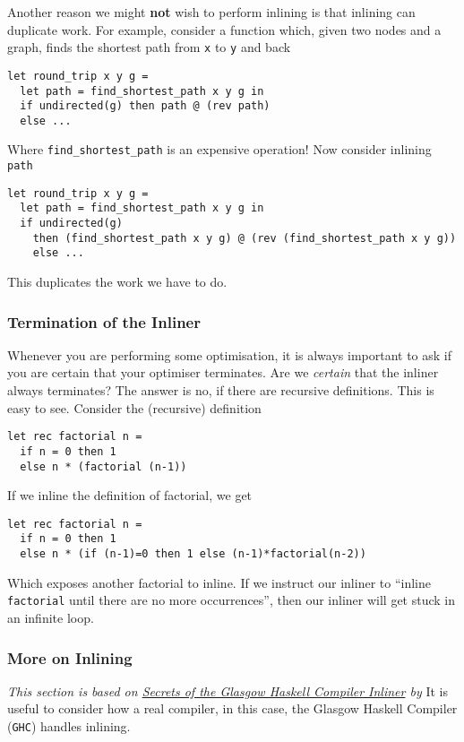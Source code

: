 Another reason we might \textbf{not} wish to perform inlining is that inlining can duplicate work. For example, consider a function which, given two nodes and a graph, finds the shortest path from \texttt{x} to \texttt{y} and back 
\begin{verbatim}
let round_trip x y g =
  let path = find_shortest_path x y g in
  if undirected(g) then path @ (rev path)
  else ...
\end{verbatim}
Where \texttt{find\_shortest\_path} is an expensive operation! Now consider inlining \texttt{path}
\begin{verbatim}
let round_trip x y g =
  let path = find_shortest_path x y g in
  if undirected(g) 
    then (find_shortest_path x y g) @ (rev (find_shortest_path x y g))
    else ...
\end{verbatim}
This duplicates the work we have to do.


\subsubsection{Termination of the Inliner}
Whenever you are performing some optimisation, it is always important to ask if you are certain that your optimiser terminates. Are we \textit{certain} that the inliner always terminates? The answer is no, if there are recursive definitions. This is easy to see. Consider the (recursive) definition
\begin{verbatim}
let rec factorial n =
  if n = 0 then 1
  else n * (factorial (n-1))
\end{verbatim}
If we inline the definition of factorial, we get
\begin{verbatim}
let rec factorial n =
  if n = 0 then 1
  else n * (if (n-1)=0 then 1 else (n-1)*factorial(n-2))
\end{verbatim}
Which exposes another factorial to inline. If we instruct our inliner to ``inline \texttt{factorial} until there are no more occurrences'', then our inliner will get stuck in an infinite loop.

\subsubsection{More on Inlining\optional}
\textit{This section is based on \href{https://www.microsoft.com/en-us/research/wp-content/uploads/2002/07/inline.pdf}{Secrets of the Glasgow Haskell Compiler Inliner} by } \citet{peyton-jones-2002}
It is useful to consider how a real compiler, in this case, the Glasgow Haskell Compiler (\texttt{GHC}) handles inlining. 

